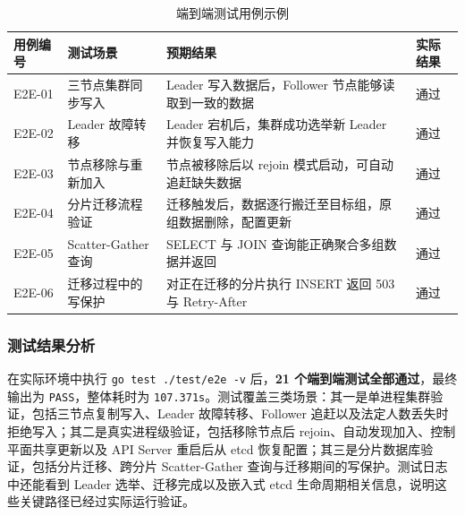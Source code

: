 \documentclass[UTF8,a4paper,12pt]{ctexart}
\begin{document}
\begin{table}[!htbp]
  \centering
  \caption{端到端测试用例示例}
  \begin{tcolorbox}[
    enhanced,
    colback=white,
    colframe=GoogleBorder,
    arc=6pt,
    boxrule=1pt,
    left=0pt, right=0pt, top=0pt, bottom=0pt,
    boxsep=0pt,
    fontupper=\sffamily
  ]
  \small
  \renewcommand{\arraystretch}{1.8}
  \begin{tabularx}{\linewidth}{p{1.6cm} | p{3cm} | X | p{1.3cm}}
    \rowcolor{GoogleHeader}
    \textbf{用例编号} & \textbf{测试场景} & \textbf{预期结果} & \textbf{实际结果} \\
    \hline
    E2E-01 & 三节点集群同步写入 & Leader 写入数据后，Follower 节点能够读取到一致的数据 & 通过 \\
    \hline
    E2E-02 & Leader 故障转移 & Leader 宕机后，集群成功选举新 Leader 并恢复写入能力 & 通过 \\
    \hline
    E2E-03 & 节点移除与重新加入 & 节点被移除后以 rejoin 模式启动，可自动追赶缺失数据 & 通过 \\
    \hline
    E2E-04 & 分片迁移流程验证 & 迁移触发后，数据逐行搬迁至目标组，原组数据删除，配置更新 & 通过 \\
    \hline
    E2E-05 & Scatter-Gather 查询 & SELECT 与 JOIN 查询能正确聚合多组数据并返回 & 通过 \\
    \hline
    E2E-06 & 迁移过程中的写保护 & 对正在迁移的分片执行 INSERT 返回 503 与 Retry-After & 通过 \\
  \end{tabularx}
  \end{tcolorbox}
\end{table}

\subsubsection{测试结果分析}
在实际环境中执行 \texttt{go test ./test/e2e -v} 后，\textbf{21 个端到端测试全部通过}，最终输出为 \texttt{PASS}，整体耗时为 \texttt{107.371s}。测试覆盖三类场景：其一是单进程集群验证，包括三节点复制写入、Leader 故障转移、Follower 追赶以及法定人数丢失时拒绝写入；其二是真实进程级验证，包括移除节点后 rejoin、自动发现加入、控制平面共享更新以及 API Server 重启后从 etcd 恢复配置；其三是分片数据库验证，包括分片迁移、跨分片 Scatter-Gather 查询与迁移期间的写保护。测试日志中还能看到 Leader 选举、迁移完成以及嵌入式 etcd 生命周期相关信息，说明这些关键路径已经过实际运行验证。
\end{document}
